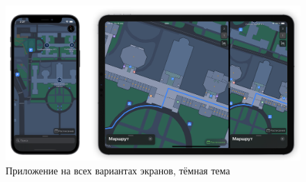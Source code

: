   \begin{figure}[H]
    \includegraphics[width=1\textwidth]{assets/appendix/ios-result/dark.png}
    \caption*{Приложение на всех вариантах экранов, тёмная тема}
  \end{figure}


